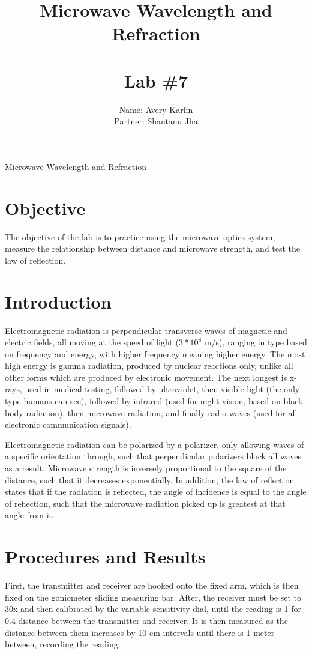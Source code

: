 \documentclass[11pt, titlepage]{article}
\title{Microwave Wavelength and Refraction \\ \ \\ \large Lab \#7}
\author{Name: Avery Karlin \\ Partner: Shantanu Jha}
\date{}
\begin{document}
\maketitle

\begin{center}
\LARGE Microwave Wavelength and Refraction
\end{center}

\section*{Objective}
The objective of the lab is to practice using the microwave optics system, measure the relationship between distance and microwave strength, and test the law of reflection.

\section*{Introduction}
Electromagnetic radiation is perpendicular transverse waves of magnetic and electric fields, all moving at the speed of light ($3 * 10^8$ m/s), ranging in type based on frequency and energy, with higher frequency meaning higher energy. The most high energy is gamma radiation, produced by nuclear reactions only, unlike all other forms which are produced by electronic movement. The next longest is x-rays, used in medical testing, followed by ultraviolet, then visible light (the only type humans can see), followed by infrared (used for night vision, based on black body radiation), then microwave radiation, and finally radio waves (used for all electronic communication signals).

Electromagnetic radiation can be polarized by a polarizer, only allowing waves of a specific orientation through, such that perpendicular polarizers block all waves as a result. Microwave strength is inversely proportional to the square of the distance, such that it decreases exponentially. In addition, the law of reflection states that if the radiation is reflected, the angle of incidence is equal to the angle of reflection, such that the microwave radiation picked up is greatest at that angle from it.

\section*{Procedures and Results}

First, the transmitter and receiver are hooked onto the fixed arm, which is then fixed on the goniometer sliding measuring bar. After, the receiver must be set to 30x and then calibrated by the variable sensitivity dial, until the reading is 1 for 0.4 distance between the transmitter and receiver. It is then measured as the distance between them increases by 10 cm intervals until there is 1 meter between, recording the reading. 
\end{document}
